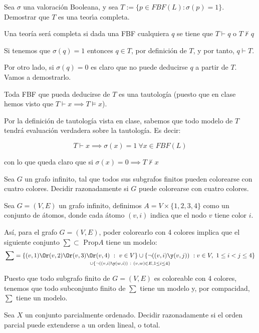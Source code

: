 \begin{problem}[3]
Sea $\sigma$ una valoraci\'on Booleana, y sea $T :=\{p\in FBF(L) : \sigma(p) = 1\}$.
Demostrar que $T$ es una teor\'{\i}a completa.
\solution

Una teoría será completa si dada una FBF cualquiera $q$ se tiene que $T \vdash q$ o $T \nvdash q$

Si tenemos que $σ(q)=1$ entonces $q \in T$, por definición de $T$, y por tanto, $q \vdash T$.

Por otro lado, si $σ(q)=0$ es claro que no puede deducirse $q$ a partir de $T$. Vamos a demostrarlo.

Toda FBF que pueda deducirse de $T$ es una tautología (puesto que en clase hemos visto que $T \vdash x \implies T \vDash x$).

Por la definición de tautología vista en clase, sabemos que todo modelo de $T$ tendrá evaluación verdadera sobre la tautología. Es decir:

\[T \vdash x \implies σ(x) = 1 \ \forall x\in FBF(L)\]

con lo que queda claro que si $σ(x)=0 \implies T \nvdash x$
\end{problem}

\begin{problem}[4]
Sea $G$ un grafo infinito, tal que todos sus subgrafos finitos pueden colorearse con cuatro colores.
Decidir razonadamente si $G$ puede colorearse con cuatro colores.
\solution

Sea $G=(V,E)$ un grafo infinito, definimos $A=V \times \{1,2,3,4\}$ como un conjunto de átomos, donde cada átomo $(v,i)$ indica que el nodo $v$ tiene color $i$.

Así, para el grafo $G=(V,E)$, poder colorearlo con 4 colores implica que el siguiente conjunto $\sum \subset \text{ Prop} A$ tiene un modelo:
\[\sum = \{(v,1)\Or (v,2) \Or (v,3) \Or (v,4) \ : \ v \in V\} \cup \{\neg((v,i)\y(v,j)) \ : v \in V, \ 1 \leq i < j \leq 4\}\atop \cup \{\neg((v,i)\y (w,i)) \ : \ (v,w) \in E,  1 \leq i \leq 4\}\]

Puesto que todo subgrafo finito de $G=(V,E)$ es coloreable con 4 colores, tenemos que todo subconjunto finito de $\sum$ tiene un modelo y, por compacidad, $\sum$ tiene un modelo.

\end{problem}

\begin{problem}[5]
Sea $X$ un conjunto parcialmente ordenado. Decidir razonadamente si el orden parcial puede
extenderse a un orden lineal, o total.
\solution


\end{problem}

